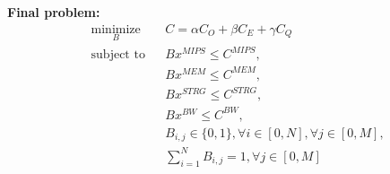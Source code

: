 \documentclass{article}
\begin{document}
\noindent\textbf{Final problem:}\\[6pt]
\begin{equation*}
\begin{aligned}
& \underset{B}{\text{minimize}}
& & C = \alpha C_O + \beta C_E + \gamma C_Q \\
& \text{subject to}
& & B x^{MIPS} \leq C^{MIPS}, \\
&&& B x^{MEM} \leq C^{MEM}, \\
&&& B x^{STRG} \leq C^{STRG}, \\
&&& B x^{BW} \leq C^{BW}, \\
&&& B_{i,j} \in \{0, 1\}, \forall i \in [0, N], \forall j \in [0, M],\\
&&& \sum_{i=1}^{N} B_{i,j} = 1, \forall j \in [0, M]
\end{aligned}
\end{equation*}
\end{document}

